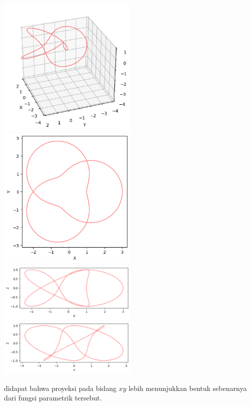 \documentclass[twoside]{scrarticle}
\begin{document}
\begin{enumerate}
\begin{minipage}{\linewidth}
    \includegraphics[width=0.5\textwidth]{50.png}
    \includegraphics[width=0.5\textwidth]{50_1.png}
    \includegraphics[width=0.5\textwidth]{50_2.png}
    \includegraphics[width=0.5\textwidth]{50_3.png}
\end{minipage}

didapat bahwa proyeksi pada bidang $xy$ lebih menunjukkan bentuk sebenarnya dari fungsi parametrik tersebut.

\end{enumerate}
\end{document}
